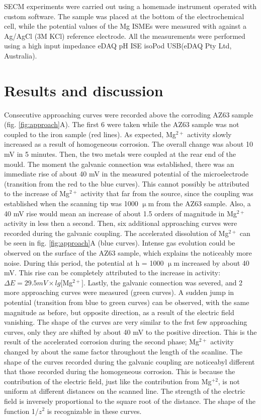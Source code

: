 \documentclass[3p]{elsarticle}
\begin{document}
SECM experiments were carried out using a homemade instrument operated with custom software. The sample was placed at the bottom of the electrochemical cell, while the potential values of the Mg ISMEs were measured with against a Ag/AgCl (3M KCl) reference electrode. All the measurements were performed using a high input impedance eDAQ pH ISE isoPod USB(eDAQ Pty Ltd, Australia).

\section{Results and discussion}

Consecutive approaching curves were recorded above the corroding AZ63 sample (fig. \ref{fig:approach}A). The first 6 were taken while the AZ63 sample was not coupled to the iron sample (red lines). As expected, Mg$^{2+}$ activity slowly increased as a result of homogeneous corrosion. The overall change was about 10 mV in 5 minutes. Then, the two metals were coupled at the rear end of the mould. The moment the galvanic connection was established, there was an immediate rise of about 40 mV in the measured potential of the microelectrode (transition from the red to the blue curves). This cannot possibly be attributed to the increase of Mg$^{2+}$ activity that far from the source, since the coupling was established when the scanning tip was 1000 $\upmu$m from the AZ63 sample. Also, a 40 mV rise would mean an increase of about 1.5 orders of magnitude in Mg$^{2+}$ activity in less then a second. Then, six additional approaching curves were recorded during the galvanic coupling. The accelerated dissolution of Mg$^{2+}$ can be seen in fig. \ref{fig:approach}A (blue curves). Intense gas evolution could be observed on the surface of the AZ63 sample, which explains the noticeably more noise. During this period, the potential at h = 1000 $\upmu$m increased by about 40 mV. This rise can be completely attributed to the increase in activity: $\Delta E = 29.5 mV \times lg[$Mg$^{2+}]$. Lastly, the galvanic connection was severed, and 2 more approaching curves were measured (green curves). A sudden jump in potential (transition from blue to green curves) can be observed, with the same magnitude as before, but opposite direction, as a result of the electric field vanishing. The shape of the curves are very similar to the frst few approaching curves, only they are shifted by about 40 mV to the positive direction. This is the result of the accelerated corrosion during the second phase; Mg$^{2+}$ activity changed by about the same factor throughout the length of the scanline. The shape of the curves recorded during the galvanic coupling are noticeabyl different that those recorded during the homogeneous corrosion. This is because the contribution of the electric field, just like the contribution from Mg$^{+2}$, is not uniform at different distances on the scanned line. The strength of the electric field is inversely proportional to the square root of the distance. The shape of the function 1/$z^2$ is recognizable in these curves.
\end{document}

